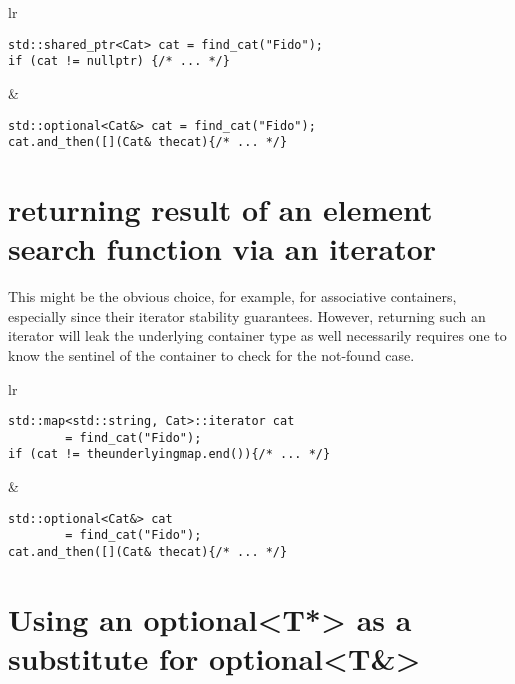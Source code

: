 \documentclass[a4paper,10pt,oneside,openany,final,article]{memoir}
\begin{document}
  \begin{tabular}{ lr }
  \begin{minipage}[t]{0.45\columnwidth}
    \begin{verbatim}
std::shared_ptr<Cat> cat = find_cat("Fido");
if (cat != nullptr) {/* ... */}

    \end{verbatim}
  \end{minipage}
  &
    \begin{minipage}[t]{0.45\columnwidth}
      \begin{verbatim}
std::optional<Cat&> cat = find_cat("Fido");
cat.and_then([](Cat& thecat){/* ... */}

      \end{verbatim}
    \end{minipage}
  \end{tabular}
  \section{returning result of an element search function via an iterator}

  This might be the obvious choice, for example, for associative containers, especially since their iterator stability guarantees.
  However, returning such an iterator will leak the underlying container type as well necessarily requires one to know the sentinel of the container to check for the not-found case.

  \begin{tabular}{ lr }
  \begin{minipage}[t]{0.45\columnwidth}
    \begin{verbatim}
std::map<std::string, Cat>::iterator cat
        = find_cat("Fido");
if (cat != theunderlyingmap.end()){/* ... */}

    \end{verbatim}
  \end{minipage}
  &
    \begin{minipage}[t]{0.45\columnwidth}
      \begin{verbatim}
std::optional<Cat&> cat
        = find_cat("Fido");
cat.and_then([](Cat& thecat){/* ... */}

      \end{verbatim}
    \end{minipage}
  \end{tabular}

  \section{Using an optional<T*> as a substitute for optional<T\&>}
\end{document}
